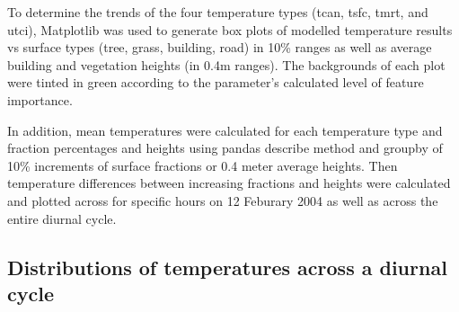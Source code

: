 \documentclass[final,3p,times,authoryear]{elsarticle}
\begin{document}
% 

To determine the trends of the four temperature types (\gls{tcan}, \gls{tsfc}, \gls{tmrt}, and \gls{utci}), Matplotlib \citep{Hunter2007} was used to generate box plots of modelled temperature results vs surface types (tree, grass, building, road) in 10\% ranges as well as average building and vegetation heights (in 0.4m ranges). The backgrounds of each plot were tinted in green according to the parameter's calculated level of feature importance.


In addition, mean temperatures were calculated for each temperature type and fraction percentages and heights using pandas \citep{reback2020pandas} describe method and groupby of 10\% increments of surface fractions or 0.4 meter average heights. Then temperature differences between increasing fractions and heights were calculated and plotted across for specific hours on 12 Feburary 2004 as well as across the entire diurnal cycle.



\subsection{Distributions of temperatures across a diurnal cycle}\label{sec:methodsdist}
%
% 
\end{document}
